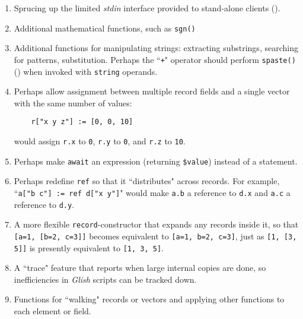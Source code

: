 \begin{enumerate}
\item Sprucing up the limited {\em stdin} interface provided to stand-alone
clients ().

\item Additional mathematical functions,
such as {\tt sgn()}

\item Additional functions for manipulating strings: extracting substrings,
searching for patterns, substitution.  Perhaps the ``{\tt +}" operator should
perform {\tt spaste()} () when invoked with {\tt string}
operands.

\item Perhaps allow assignment between multiple record fields and a
single vector with the same number of values:
\begin{verbatim}
    r["x y z"] := [0, 0, 10]
\end{verbatim}
would assign {\tt r.x} to {\tt 0}, {\tt r.y} to {\tt 0}, and {\tt r.z}
to {\tt 10}.

\item Perhaps make
{\tt await} an expression (returning {\tt \$value})
instead of a statement.

\item Perhaps redefine {\tt ref} so that it ``distributes" across
records.  For example, ``{\tt a["b c"] := ref d["x y"]}" would
make {\tt a.b} a reference to {\tt d.x} and {\tt a.c} a reference
to {\tt d.y}.

\item A more flexible {\tt record}-constructor that expands any
records inside it, so that {\tt [a=1, [b=2, c=3]]} becomes equivalent to
{\tt [a=1, b=2, c=3]}, just as {\tt [1, [3, 5]]} is presently
equivalent to {\tt [1, 3, 5]}.

\item A ``trace"
feature that reports when large internal copies
are done, so inefficiencies in {\em Glish} scripts can be tracked down.

\item Functions for ``walking" records or vectors and applying
other functions to each element or field.


\end{enumerate}
